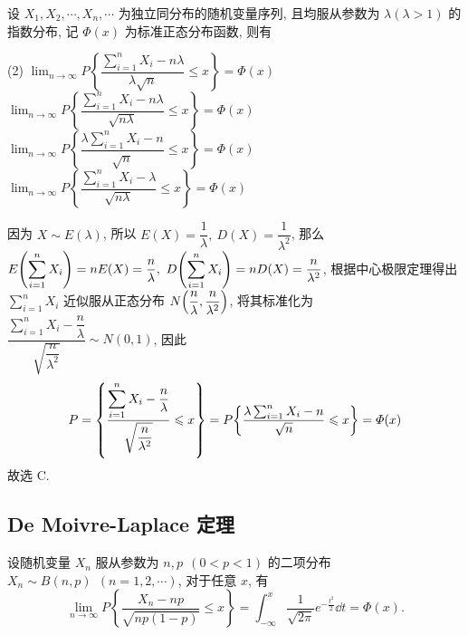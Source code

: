 \begin{example}
    设 $ X_{1}, X_{2}, \cdots, X_{n}, \cdots $ 为独立同分布的随机变量序列, 且均服从参数为 $ \lambda(\lambda>1) $ 的指数分布, 记 $ \varPhi(x) $ 为标准正态分布函数, 则有
    \begin{tasks}(2)
        \task $\displaystyle \lim _{n \rightarrow \infty} P\left\{\dfrac{\sum_{i=1}^{n} X_{i}-n \lambda}{\lambda \sqrt{n}} \leqslant x\right\}=\varPhi(x) $
        \task $\displaystyle \lim _{n \rightarrow \infty} P\left\{\dfrac{\sum_{i=1}^{n} X_{i}-n \lambda}{\sqrt{n \lambda}} \leqslant x\right\}=\varPhi(x) $
        \task $\displaystyle \lim _{n \rightarrow \infty} P\left\{\dfrac{\lambda \sum_{i=1}^{n} X_{i}-n}{\sqrt{n}} \leqslant x\right\}=\varPhi(x) $
        \task $\displaystyle \lim _{n \rightarrow \infty} P\left\{\dfrac{\sum_{i=1}^{n} X_{i}-\lambda}{\sqrt{n \lambda}} \leqslant x\right\}=\varPhi(x) $
    \end{tasks}
\end{example}
\begin{solution}
    因为 $X\sim E(\lambda)$, 所以 $E(X)=\dfrac{1}{\lambda},~D(X)=\dfrac{1}{\lambda^2}$, 那么 $E\qty(\displaystyle\sum_{i=1}^{n}X_i)=nE(X)=\dfrac{n}{\lambda},~D\qty(\displaystyle \sum_{i=1}^{n}X_i)=nD(X)=\dfrac{n}{\lambda^2}$, 
    根据中心极限定理得出 $\displaystyle\sum_{i=1}^{n}X_i$ 近似服从正态分布 $N\qty(\dfrac{n}{\lambda},\dfrac{n}{\lambda^2})$, 将其标准化为 $\dfrac{\displaystyle\sum_{i=1}^{n}X_i-\dfrac{n}{\lambda}}{\sqrt{\dfrac{n}{\lambda^2}}}\sim N(0,1)$, 因此 
    $$P=\qty{\dfrac{\displaystyle\sum_{i=1}^{n}X_i-\dfrac{n}{\lambda}}{\sqrt{\dfrac{n}{\lambda^2}}}\leqslant x}=P\qty{\dfrac{\lambda\sum_{i=1}^{n}X_i-n}{\sqrt{n}}\leqslant x}=\varPhi(x)$$
    故选 C.
\end{solution}

\subsection{De Moivre-Laplace 定理}

\begin{theorem}
    设随机变量 $ X_{n} $ 服从参数为 $ n, p~~(0<p<1)$ 的二项分布 $ X_{n} \sim B(n, p)~~(n=1,2, \cdots) $, 对于任意 $ x $, 有
    $$\lim _{n \rightarrow \infty} P\left\{\frac{X_{n}-n p}{\sqrt{n p(1-p)}} \leqslant x\right\}=\int_{-\infty}^{x} \frac{1}{\sqrt{2 \pi}} e^{-\frac{t^{2}}{2}} \dd  t=\varPhi(x).$$
\end{theorem}
